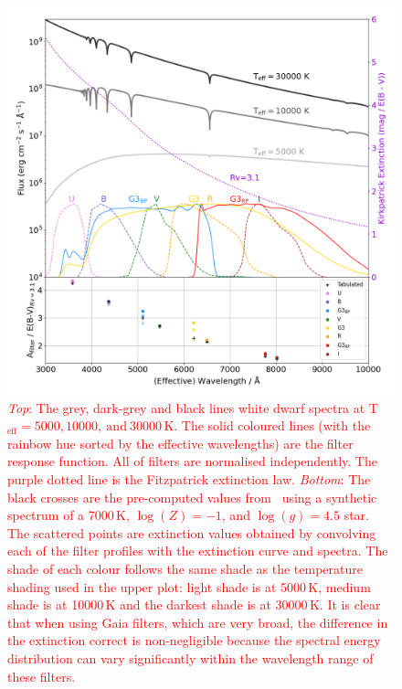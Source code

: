 \documentclass[fleqn,usenatbib]{rasti}
\begin{document}
\begin{figure}
    \centering
    \includegraphics[width=\columnwidth]{fig_12_reddening_filter.png}
    \caption{\textcolor{red}{\textit{Top}: The grey, dark-grey and black
    lines white dwarf spectra at
    T$_{\mathrm{eff}}=5000, 10000, \mathrm{\ and\ } 30000$\,K. The solid
    coloured lines (with the rainbow hue sorted by the effective wavelengths)
    are the filter response function. All of filters are normalised
    independently. The purple dotted line is the Fitzpatrick extinction law.
    \textit{Bottom}: The black crosses are the pre-computed values
    from~\citet{2011ApJ...737..103S} using a synthetic spectrum of a 7000\,K,
    $\log(Z) = -1$, and $\log(g) = 4.5$ star. The scattered points are
    extinction values obtained by convolving each of the filter profiles with
    the extinction curve and spectra. The shade of each colour follows the
    same shade as the temperature shading used in the upper plot: light shade
    is at 5000\,K, medium shade is at 10000\,K and the darkest shade is at
    30000\,K. It is clear that when using Gaia filters, which are very broad,
    the difference in the extinction correct is non-negligible because the
    spectral energy distribution can vary significantly within the wavelength
    range of these filters.}}
    \label{fig:interstellar_reddening}
\end{figure}
\end{document}
